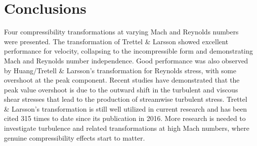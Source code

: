 \section{Conclusions}
Four compressibility transformations at varying Mach and Reynolds numbers were presented. The transformation of Trettel \& Larsson showed excellent performance for velocity, collapsing to the incompressible form and demonstrating Mach and Reynolds number independence. Good performance was also observed by Huang/Tretell \& Larsson's transformation for Reynolds stress, with some overshoot at the peak component. Recent studies \cite{hasanIntrinsicCompressibilityEffects2025} have demonstrated that the peak value overshoot is due to the outward shift in the turbulent and viscous shear stresses that lead to the production of streamwise turbulent stress. Trettel \& Larsson's transformation is still well utilized in current research and has been cited 315 times to date since its publication in 2016. More research is needed to investigate turbulence and related transformations at high Mach numbers, where genuine compressibility effects start to matter.